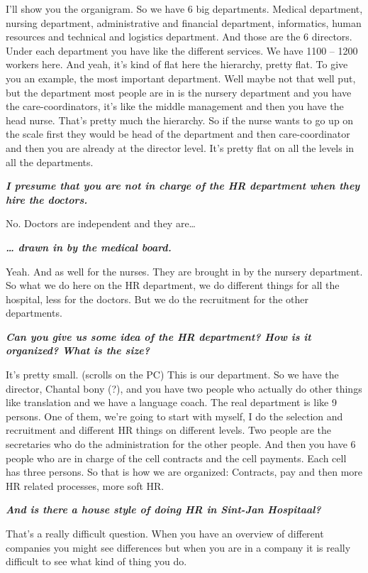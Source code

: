 \documentclass[a4paper,fleqn,11pt,dvips,titlepage]{article}
\newcommand{\question}[1]{\textbf{\textit{#1}}}
\numberwithin{figure}{section}
\numberwithin{equation}{section}
\begin{document}
I’ll show you the organigram. So we have 6 big departments. Medical department, nursing department, administrative and financial department, informatics, human resources and technical and logistics department. And those are the 6 directors. Under each department you have like the different services. We have 1100 – 1200 workers here. And yeah, it’s kind of flat here the hierarchy, pretty flat. To give you an example, the most important department. Well maybe not that well put, but the department most people are in is the nursery department and you have the care-coordinators, it’s like the middle management and then you have the head nurse. That’s pretty much the hierarchy. So if the nurse wants to go up on the scale first they would be head of the department and then care-coordinator and then you are already at the director level. It’s pretty flat on all the levels in all the departments.  

\question{I presume that you are not in charge of the HR department when they hire the doctors.}

No. Doctors are independent and they are…

\question{… drawn in by the medical board. }

Yeah. And as well for the nurses. They are brought in by the nursery department. So what we do here on the HR department, we do different things for all the hospital, less for the doctors. But we do the recruitment for the other departments. 

\question{Can you give us some idea of the HR department? How is it organized? What is the size? }

It’s pretty small. (scrolls on the PC) This is our department. So we have the director, Chantal bony (?), and you have two people who actually do other things like translation and we have a language coach. The real department is like 9 persons. One of them, we’re going to start with myself, I do the selection and recruitment and different HR things on different levels. Two people are the secretaries who do the administration for the other people. And then you have 6 people who are in charge of the cell contracts and the cell payments. Each cell has three persons. So that is how we are organized: Contracts, pay and then more HR related processes, more soft HR.  

\question{And is there a house style of doing HR in Sint-Jan Hospitaal?}

That’s a really difficult question. When you have an overview of different companies you might see differences but when you are in a company it is really difficult to see what kind of thing you do. 
\end{document}
